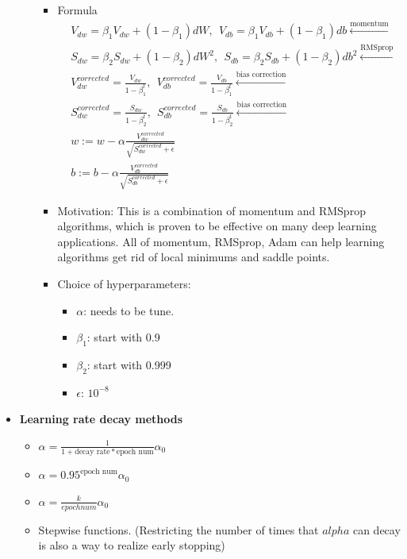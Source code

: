 \begin{itemize}
\begin{itemize}
    \begin{itemize}
        \item Formula
        \begin{align*}
            &V_{dw} = \beta_1 V_{dw} + (1-\beta_1) dW,~~
            V_{db} = \beta_1 V_{db} + (1-\beta_1) db \xleftarrow{\text{momentum}}\\
            &S_{dw} = \beta_2 S_{dw} + (1-\beta_2) dW^2,~~ 
            S_{db} = \beta_2 S_{db} + (1-\beta_2) db^2
            \xleftarrow{\text{RMSprop}}\\
            &V^{corrected}_{dw} = \frac{V_{dw}}{1-\beta_1^t},~~
            V^{corrected}_{db} = \frac{V_{db}}{1-\beta_1^t}\xleftarrow{\text{bias correction}}\\
            &S^{corrected}_{dw} = \frac{S_{dw}}{1-\beta_2^t},~~
            S^{corrected}_{db} = \frac{S_{db}}{1-\beta_2^t}\xleftarrow{\text{bias correction}}\\
            &w:= w-\alpha\frac{V^{corrected}_{dw}}{\sqrt{S^{corrected}_{dw} + \epsilon}}\\
            &b:= b-\alpha\frac{V^{corrected}_{db}}{\sqrt{S^{corrected}_{db} + \epsilon}}
        \end{align*}
        \item Motivation: This is a combination of momentum and RMSprop algorithms, which is proven to be effective on many deep learning applications. All of momentum, RMSprop, Adam can help learning algorithms get rid of local minimums and saddle points. 
        \item Choice of hyperparameters: 
        \begin{itemize}
            \item $\alpha$: needs to be tune.
            \item $\beta_1$: start with 0.9
            \item $\beta_2$: start with 0.999
            \item $\epsilon$: $10^{-8}$
        \end{itemize}
    \end{itemize}
    \end{itemize}

    \item \textbf{Learning rate decay methods}
    \begin{itemize}
        \item $\alpha = \frac{1}{1+\text{decay rate}*\text{epoch num}} \alpha_0$
        \item $\alpha = 0.95^{\text{epoch num}} \alpha_0$
        \item $\alpha = \frac{k}{epoch num} \alpha_0$
        \item Stepwise functions. (Restricting the number of times that $alpha$ can decay is also a way to realize early stopping)
    \end{itemize}


\end{itemize}
